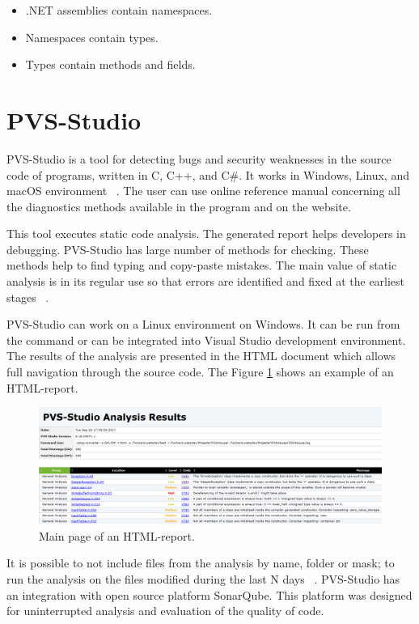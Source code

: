 \begin{itemize}
	\item .NET assemblies contain namespaces.
	\item Namespaces contain types.
	\item Types contain methods and fields.
\end{itemize}

\section{PVS-Studio}

PVS-Studio is a tool for detecting bugs and security weaknesses in the source code of programs, written in C, C++, and C\#. It works in Windows, Linux, and macOS environment ~\cite{pvs}. The user can use online reference manual concerning all the diagnostics methods available in the program and  on the website.

This tool executes static code analysis. The generated report helps developers in debugging. PVS-Studio has large number of methods for checking. These methods help to find typing and copy-paste mistakes. The main value of static analysis is in its regular use so that errors are identified and fixed at the earliest stages ~\cite{pvs}. 				

PVS-Studio can work on a Linux environment on Windows. It can be run from the command or can be integrated into Visual Studio development environment. The results of the analysis are presented in the HTML document which allows full navigation through the source code. The Figure \ref{fig:pvs} shows an example of an HTML-report.

\begin{figure}[ht]
	\centering
	\includegraphics[width=\textwidth]{figures/pvs.png}
	\caption{Main page of an HTML-report.}
	\label{fig:pvs}
\end{figure}

It is possible to not include files from the analysis by name, folder or mask; to run the analysis on the files modified during the last N days ~\cite{pvs}. PVS-Studio has an integration with open source platform SonarQube. This platform was designed for uninterrupted analysis and evaluation of the quality of code.